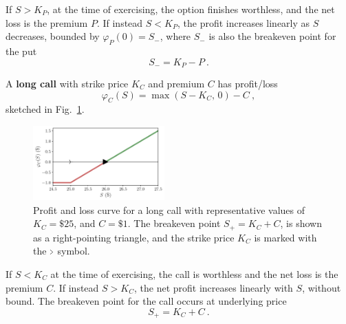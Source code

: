 \documentclass[aps,reprint]{revtex4-2}
\begin{document}
If $S > K_P$, at the time of exercising, the option finishes worthless,  and the net loss is the premium $P$. If instead $S<K_P$, the profit increases linearly as $S$ decreases, bounded by $\varphi_P(0) = S_-$, where 
$S_-$ is also the breakeven point for the put
\begin{equation}
S_- = K_P - P~.
\end{equation}


A \textbf{long call} with strike price $K_C$ and premium $C$ has profit/loss 
\begin{equation}
\varphi_C(S) = \max(S - K_C,\,0) - C~,
\end{equation}
sketched in Fig.~\ref{fig:call}.
\begin{figure}[hb]
    \centering
    \includegraphics[width=0.45\textwidth]{figs/call.pdf}
    \caption{Profit and loss curve for a long call with representative values of $K_C = \$25$, and $C = \$1$.  The breakeven point $S_+ = K_C + C$, is shown as a right-pointing triangle, and the strike price $K_C$ is marked with the $ \scalebox{0.5}[1]{$>$} $ symbol.
    }
    \label{fig:call}
\end{figure}

If $S < K_C$ at the time of exercising, the call is worthless and the net loss is the premium $C$. If instead $S>K_C$, the net profit increases
linearly with $S$, without bound. The breakeven point for the call occurs at underlying price
\begin{equation}
S_+ = K_C + C~.
\end{equation}
\end{document}
